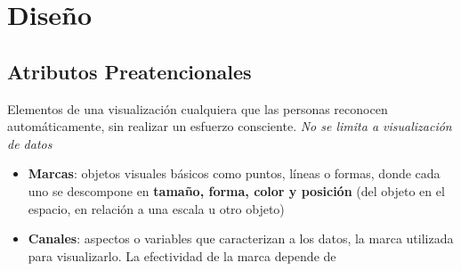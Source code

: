 
\section{Diseño}
\subsection{Atributos Preatencionales}
Elementos de una visualización cualquiera que las personas reconocen automáticamente, sin realizar un esfuerzo consciente. \textit{No se limita a visualización de datos}
\begin{itemize}
    \item {\textbf{Marcas}: objetos visuales básicos como puntos, líneas o formas, donde cada uno se descompone en \textbf{tamaño, forma, color y posición} (del objeto en el espacio, en relación a una escala u otro objeto)}
    \item {\textbf{Canales}: aspectos o variables que caracterizan a los datos, la marca utilizada para visualizarlo. La efectividad de la marca depende de
    }
\end{itemize}

